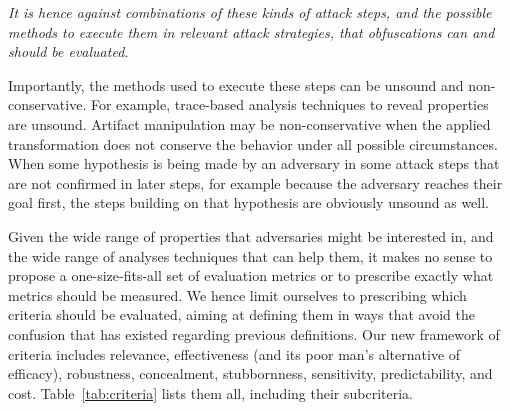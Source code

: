 \emph{It is hence against combinations of these kinds of attack steps, and the possible methods to execute them in relevant attack strategies, that obfuscations can and should be evaluated.}

Importantly, the methods used to execute these steps can be unsound and non-conservative. For example, trace-based analysis techniques to reveal properties are unsound. Artifact manipulation may be non-conservative when the applied transformation does not conserve the behavior under all possible circumstances. When some hypothesis is being made by an adversary in some attack steps that are not confirmed in later steps, for example because the adversary reaches their goal first, the steps building on that hypothesis are obviously unsound as well. 

Given the wide range of properties that adversaries might be interested in, and the wide range of analyses techniques that can help them, it makes no sense to propose a one-size-fits-all set of evaluation metrics or to prescribe exactly what metrics should be measured. We hence limit ourselves to prescribing which criteria should be evaluated, aiming at defining them in ways that avoid the confusion that has existed regarding previous definitions. Our new framework of criteria includes relevance, effectiveness (and its poor man's alternative of efficacy), robustness, concealment, stubbornness, sensitivity, predictability, and cost. Table~\ref{tab:criteria} lists them all, including their subcriteria. 

